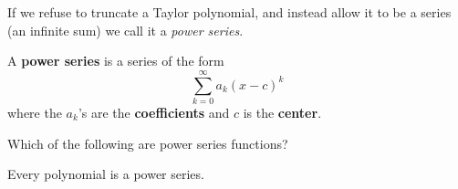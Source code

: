 \documentclass{ximera}
\begin{document}
If we refuse to truncate a Taylor polynomial, and instead allow it to
be a series (an infinite sum) we call it a \textit{power series}. 

\begin{definition}
  A \textbf{power series} is a series of the form
  \[
  \sum_{k=0}^\infty a_k(x-c)^k
  \]
  where the $a_k$'s are the \textbf{coefficients} and $c$ is the
  \textbf{center}.
\end{definition}

\begin{question}
  Which of the following are power series functions?
  \begin{selectAll}
  \end{selectAll}
  \begin{hint}
    Every polynomial is a power series.
  \end{hint}
\end{question}
\end{document}
